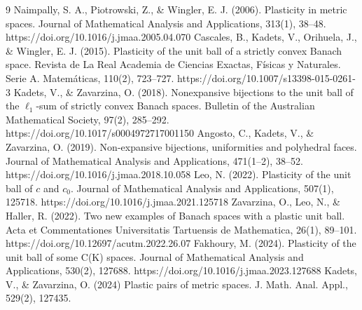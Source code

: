 \documentclass[reqno]{amsart}
\theoremstyle{plain}
\theoremstyle{remark}
\theoremstyle{definition}
\begin{document}
\begin{thebibliography}{9}
     Naimpally, S. A., Piotrowski, Z., \& Wingler, E. J. (2006). Plasticity in metric spaces. Journal of Mathematical Analysis and Applications, 313(1), 38–48. https://doi.org/10.1016/j.jmaa.2005.04.070
     Cascales, B., Kadets, V., Orihuela, J., \& Wingler, E. J. (2015). Plasticity of the unit ball of a strictly convex Banach space. Revista de La Real Academia de Ciencias Exactas, Físicas y Naturales. Serie A. Matemáticas, 110(2), 723–727. https://doi.org/10.1007/s13398-015-0261-3 
     Kadets, V., \& Zavarzina, O. (2018). Nonexpansive bijections to the unit ball of the $\ell_1$-sum of strictly convex Banach spaces. Bulletin of the Australian Mathematical Society, 97(2), 285–292. https://doi.org/10.1017/s0004972717001150 
     Angosto, C., Kadets, V., \& Zavarzina, O. (2019). Non-expansive bijections, uniformities and polyhedral faces. Journal of Mathematical Analysis and Applications, 471(1–2), 38–52. https://doi.org/10.1016/j.jmaa.2018.10.058 
     Leo, N. (2022). Plasticity of the unit ball of $c$ and $c_0$. Journal of Mathematical Analysis and Applications, 507(1), 125718. https://doi.org/10.1016/j.jmaa.2021.125718 
     Zavarzina, O., Leo, N., \& Haller, R. (2022). Two new examples of Banach spaces with a plastic unit ball. Acta et Commentationes Universitatis Tartuensis de Mathematica, 26(1), 89–101. https://doi.org/10.12697/acutm.2022.26.07 
     Fakhoury, M. (2024). Plasticity of the unit ball of some C(K) spaces. Journal of Mathematical Analysis and Applications, 530(2), 127688. https://doi.org/10.1016/j.jmaa.2023.127688 
      Kadets, V., \& Zavarzina, O. (2024) Plastic pairs of metric spaces. J. Math. Anal. Appl., 529(2), 127435.
\end{thebibliography}
\end{document}
